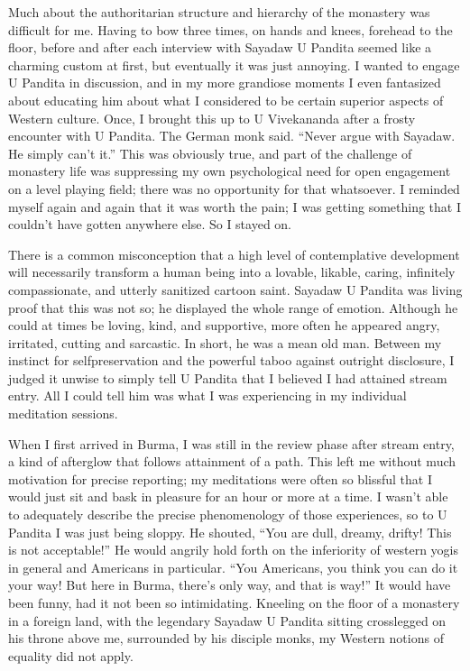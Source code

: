 \documentclass[a5paper,10pt,english]{book}
\begin{document}
\sphinxAtStartPar
Much about the authoritarian structure and hierarchy of the monastery
was difficult for me. Having to bow three times, on hands and knees,
forehead to the floor, before and after each interview with Sayadaw U
Pandita seemed like a charming custom at first, but eventually it was
just annoying. I wanted to engage U Pandita in discussion, and in my
more grandiose moments I even fantasized about educating him about what
I considered to be certain superior aspects of Western culture. Once, I
brought this up to U Vivekananda after a frosty encounter with U
Pandita. The German monk said. “Never argue with Sayadaw. He simply
can’t  it.” This was obviously true, and part of the challenge
of monastery life was suppressing my own psychological need for open
engagement on a level playing field; there was no opportunity for that
whatsoever. I reminded myself again and again that it was worth the
pain; I was getting something that I couldn’t have gotten anywhere else.
So I stayed on.

\sphinxAtStartPar
There is a common misconception that a high level of contemplative
development will necessarily transform a human being into a lovable,
likable, caring, infinitely compassionate, and utterly sanitized cartoon
saint. Sayadaw U Pandita was living proof that this was not so; he
displayed the whole range of emotion. Although he could at times be
loving, kind, and supportive, more often he appeared angry, irritated,
cutting and sarcastic. In short, he was a mean old man. Between my
instinct for self\sphinxhyphen{}preservation and the powerful taboo against outright
disclosure, I judged it unwise to simply tell U Pandita that I believed
I had attained stream entry. All I could tell him was what I was
experiencing in my individual meditation sessions.

\sphinxAtStartPar
When I first arrived in Burma, I was still in the review phase after
stream entry, a kind of afterglow that follows attainment of a path.
This left me without much motivation for precise reporting; my
meditations were often so blissful that I would just sit and bask in
pleasure for an hour or more at a time. I wasn’t able to adequately
describe the precise phenomenology of those experiences, so to U Pandita
I was just being sloppy. He shouted, “You are dull, dreamy, drifty! This
is not acceptable!” He would angrily hold forth on the inferiority of
western yogis in general and Americans in particular. “You Americans,
you think you can do it your way! But here in Burma, there’s only 
way, and that is  way!” It would have been funny, had it not been so
intimidating. Kneeling on the floor of a monastery in a foreign land,
with the legendary Sayadaw U Pandita sitting cross\sphinxhyphen{}legged on his throne
above me, surrounded by his disciple monks, my Western notions of
equality did not apply.
\end{document}

